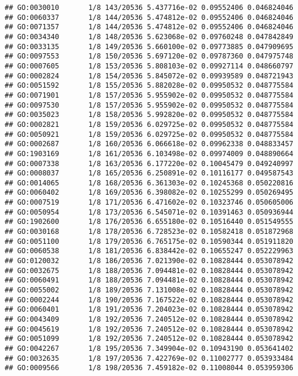 \documentclass[
]{article}
\begin{document}
\begin{verbatim}
## GO:0030010       1/8 143/20536 5.437716e-02 0.09552406 0.046824046
## GO:0060337       1/8 144/20536 5.474812e-02 0.09552406 0.046824046
## GO:0071357       1/8 144/20536 5.474812e-02 0.09552406 0.046824046
## GO:0034340       1/8 148/20536 5.623068e-02 0.09760248 0.047842849
## GO:0033135       1/8 149/20536 5.660100e-02 0.09773885 0.047909695
## GO:0097553       1/8 150/20536 5.697120e-02 0.09787360 0.047975748
## GO:0007605       1/8 153/20536 5.808103e-02 0.09927114 0.048660797
## GO:0002824       1/8 154/20536 5.845072e-02 0.09939589 0.048721943
## GO:0051592       1/8 155/20536 5.882028e-02 0.09950532 0.048775584
## GO:0071901       1/8 157/20536 5.955902e-02 0.09950532 0.048775584
## GO:0097530       1/8 157/20536 5.955902e-02 0.09950532 0.048775584
## GO:0035023       1/8 158/20536 5.992820e-02 0.09950532 0.048775584
## GO:0002821       1/8 159/20536 6.029725e-02 0.09950532 0.048775584
## GO:0050921       1/8 159/20536 6.029725e-02 0.09950532 0.048775584
## GO:0002687       1/8 160/20536 6.066618e-02 0.09962338 0.048833457
## GO:1903169       1/8 161/20536 6.103498e-02 0.09974009 0.048890664
## GO:0007338       1/8 163/20536 6.177220e-02 0.10045479 0.049240997
## GO:0008037       1/8 165/20536 6.250891e-02 0.10116177 0.049587543
## GO:0014065       1/8 168/20536 6.361303e-02 0.10245368 0.050220816
## GO:0060402       1/8 169/20536 6.398082e-02 0.10255299 0.050269495
## GO:0007519       1/8 171/20536 6.471602e-02 0.10323746 0.050605006
## GO:0050954       1/8 173/20536 6.545071e-02 0.10391463 0.050936944
## GO:1902600       1/8 176/20536 6.655180e-02 0.10516440 0.051549555
## GO:0030168       1/8 178/20536 6.728523e-02 0.10582418 0.051872968
## GO:0051100       1/8 179/20536 6.765175e-02 0.10590344 0.051911820
## GO:0060538       1/8 181/20536 6.838442e-02 0.10655247 0.052229963
## GO:0120032       1/8 186/20536 7.021390e-02 0.10828444 0.053078942
## GO:0032675       1/8 188/20536 7.094481e-02 0.10828444 0.053078942
## GO:0060491       1/8 188/20536 7.094481e-02 0.10828444 0.053078942
## GO:0055002       1/8 189/20536 7.131008e-02 0.10828444 0.053078942
## GO:0002244       1/8 190/20536 7.167522e-02 0.10828444 0.053078942
## GO:0060401       1/8 191/20536 7.204023e-02 0.10828444 0.053078942
## GO:0043409       1/8 192/20536 7.240512e-02 0.10828444 0.053078942
## GO:0045619       1/8 192/20536 7.240512e-02 0.10828444 0.053078942
## GO:0051099       1/8 192/20536 7.240512e-02 0.10828444 0.053078942
## GO:0042267       1/8 195/20536 7.349904e-02 0.10943190 0.053641402
## GO:0032635       1/8 197/20536 7.422769e-02 0.11002777 0.053933484
## GO:0009566       1/8 198/20536 7.459182e-02 0.11008044 0.053959306

\end{verbatim}
\end{document}

